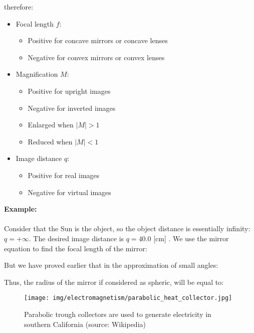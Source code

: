 	therefore:
	\begin{itemize}
		\item Focal length $f$:
			\begin{itemize}
				\item Positive for concave mirrors or concave lenses
				\item Negative for convex mirrors or convex lenses
			\end{itemize}
		\item Magnification $M$:
			\begin{itemize}
				\item Positive for upright images
				\item Negative for inverted images
				\item Enlarged when $|M|>1$
				\item Reduced when $|M|<1$
			\end{itemize}
		\item Image distance $q$:
			\begin{itemize}
				\item Positive for real images
				\item Negative for virtual images
			\end{itemize}
	\end{itemize}
	
	\begin{tcolorbox}[colframe=black,colback=white,sharp corners]
	\textbf{{\Large {}}Example:}\\\\
	Consider that the Sun is the object, so the object distance is essentially infinity: $q=+\infty$. The desired image distance
is $q=40.0$ [cm] . We use the mirror equation to find the focal length of the mirror:
	
	But we have proved earlier that in the approximation of small angles:
	
	Thus, the radius of the mirror if considered as spheric, will be equal to:
	
	\end{tcolorbox}
	
	\begin{figure}[H]
		\centering
		\texttt{[image: img/electromagnetism/parabolic\_heat\_collector.jpg]}
		\caption[Parabolic trough collectors used to generate electricity in southern California]{Parabolic trough collectors are used to generate electricity in southern California (source: Wikipedia)}
	\end{figure}
	
